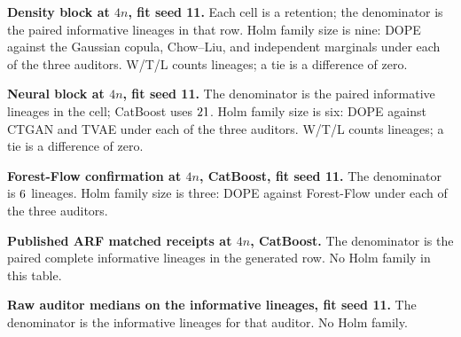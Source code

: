 \documentclass{article}
\begin{document}
\begin{table}[t]
\caption{\textbf{Density block at $4n$, fit seed 11.} Each cell is a retention; the denominator is the paired informative lineages in that row. Holm family size is nine: DOPE against the Gaussian copula, Chow--Liu, and independent marginals under each of the three auditors. W/T/L counts lineages; a tie is a difference of zero.}
\label{tab:density}
\centering
\footnotesize
\setlength{\tabcolsep}{3pt}
\resizebox{\linewidth}{!}{\begin{minipage}{7.16in}\end{minipage}}
\end{table}

\begin{table}[t]
\caption{\textbf{Neural block at $4n$, fit seed 11.} The denominator is the paired informative lineages in the cell; CatBoost uses $\NNeuCb$. Holm family size is six: DOPE against CTGAN and TVAE under each of the three auditors. W/T/L counts lineages; a tie is a difference of zero.}
\label{tab:neural}
\centering
\footnotesize
\setlength{\tabcolsep}{3pt}
\resizebox{\linewidth}{!}{\begin{minipage}{7.16in}\end{minipage}}
\end{table}

\begin{table}[t]
\caption{\textbf{Forest-Flow confirmation at $4n$, CatBoost, fit seed 11.} The denominator is $\NForestCb$ lineages. Holm family size is three: DOPE against Forest-Flow under each of the three auditors.}
\label{tab:forest}
\centering
\footnotesize
\resizebox{\linewidth}{!}{\begin{minipage}{7.16in}\end{minipage}}
\end{table}

\begin{table}[t]
\caption{\textbf{Published ARF matched receipts at $4n$, CatBoost.} The denominator is the paired complete informative lineages in the generated row. No Holm family in this table.}
\label{tab:publication}
\centering
\footnotesize
\setlength{\tabcolsep}{3pt}
\resizebox{\linewidth}{!}{\begin{minipage}{7.16in}\end{minipage}}
\end{table}

\begin{table}[t]
\caption{\textbf{Raw auditor medians on the informative lineages, fit seed 11.} The denominator is the informative lineages for that auditor. No Holm family.}
\label{tab:rmse}
\centering
\footnotesize
\setlength{\tabcolsep}{3pt}
\resizebox{\linewidth}{!}{\begin{minipage}{7.16in}\end{minipage}}
\end{table}
\end{document}
